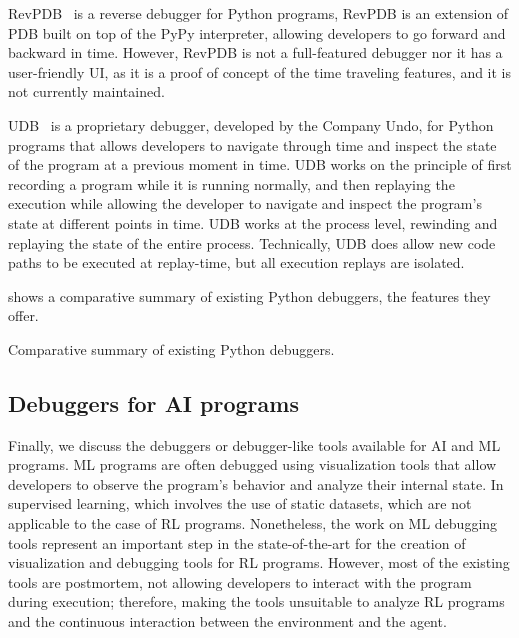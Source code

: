 \ac{RevPDB}~\cite{revdeb} is a reverse debugger for Python programs, RevPDB is an extension of 
\ac{PDB} built on top of the PyPy interpreter, allowing developers to go forward and backward in time. 
However, RevPDB is not a full-featured debugger nor it has a user-friendly UI, as it is a proof of 
concept of the time traveling features, and it is not currently maintained.


\ac{UDB}~\cite{udb} is a proprietary debugger, developed by the Company Undo, for Python 
programs that allows developers to navigate through time and inspect the state of the program at a 
previous moment in time. \ac{UDB} works on the principle of first recording 
a program while it is running normally, and then replaying the execution while allowing the 
developer to navigate and inspect the program's state at different points in time. \ac{UDB} works at 
the process level, rewinding and replaying the state of the entire process. Technically, 
\ac{UDB} does allow new code paths to be executed at replay-time, but all execution replays are 
isolated.

 shows a comparative summary of existing Python debuggers, the 
features they offer. 

\begin{table}[hptb]
  \centering
  \caption{Comparative summary of existing Python debuggers.}
  
  \label{tab:python-debuggers}
\end{table}


\subsection{Debuggers for \ac{AI} programs}
\label{sec:ai}

Finally, we discuss the debuggers or debugger-like tools available for \ac{AI} and \ac{ML} programs. 
\ac{ML} programs are often debugged using visualization tools that allow developers to observe the 
program's behavior and analyze their internal state. In supervised learning, which involves the use of  
static datasets, which are not applicable to the case of \ac{RL} programs. Nonetheless, the work on 
\ac{ML} debugging tools represent an important step in the state-of-the-art for the creation of 
visualization and debugging tools for \ac{RL} programs.
However, most of the existing tools are postmortem, not allowing developers to interact with the 
program during execution; therefore, making the tools unsuitable to analyze \ac{RL} programs and 
the continuous interaction between the environment and the agent.

